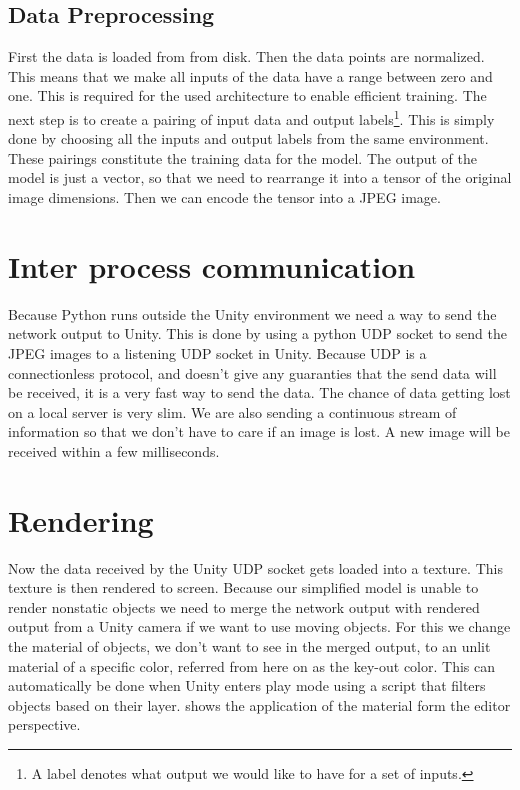 \subsection{Data Preprocessing}
First the data is loaded from from disk. Then the data points are normalized. This means that we make all inputs of the data have a range between zero and one. This is required for the used architecture to enable efficient training. The next step is to create a pairing of input data and output labels\footnote{A label denotes what output we would like to have for a set of inputs.}. This is simply done by choosing all the inputs and output labels from the same environment. These pairings constitute the training data for the model. The output of the model is just a vector, so that we need to rearrange it into a tensor of the original image dimensions. Then we can encode the tensor into a JPEG image.


\section[IPC]{Inter process communication}
Because Python runs outside the Unity environment we need a way to send the network output to Unity. This is done by using a python UDP socket to send the JPEG images to a listening UDP socket in Unity. Because UDP is a connectionless protocol, and doesn't give any guaranties that the send data will be received, it is a very fast way to send the data. The chance of data getting lost on a local server is very slim. We are also sending a continuous stream of information so that we don't have to care if an image is lost. A new image will be received within a few milliseconds.


\section{Rendering}\label{rendering}
Now the data received by the Unity UDP socket gets loaded into a texture. This texture is then rendered to screen. Because our simplified model is unable to render nonstatic objects we need to merge the network output with rendered output from a Unity camera if we want to use moving objects. For this we change the material of objects, we don't want to see in the merged output, to an unlit material of a specific color, referred from here on as the key-out color. This can automatically be done when Unity enters play mode using a script that filters objects based on their layer.  shows the application of the material form the editor perspective.

